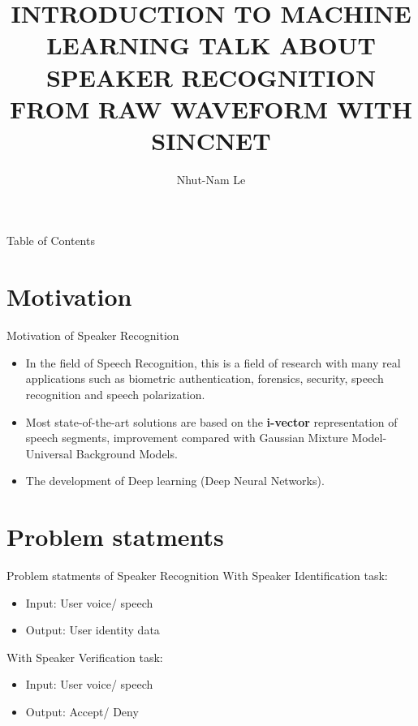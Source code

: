 \documentclass[notheorems, aspectratio=54]{beamer}
\author{Nhut-Nam Le}
\title{INTRODUCTION TO MACHINE LEARNING \newline TALK ABOUT SPEAKER RECOGNITION FROM \newline RAW WAVEFORM WITH SINCNET}
\institute{Department of Computer Science, University of Science, VNU}
\date[\today]{}
\begin{document}
\begin{frame}
	\titlepage
\end{frame}

\begin{frame}{Table of Contents}
	\tableofcontents
\end{frame}

\section{Motivation}
\begin{frame}{Motivation of Speaker Recognition}
	\begin{itemize}
		\item In the field of Speech Recognition, this is a field of research with many real applications such as biometric authentication, forensics, security, speech recognition and speech polarization.
		\item Most state-of-the-art solutions are based on the \textbf{i-vector} representation of speech segments, improvement compared with Gaussian Mixture Model-Universal Background Models.
		\item The development of Deep learning (Deep Neural Networks).
	\end{itemize}
\end{frame}
\section{Problem statments}
\begin{frame}{Problem statments of Speaker Recognition}
	With Speaker Identification task:
	\begin{itemize}
		\item Input: User voice/ speech
		\item Output: User identity data
	\end{itemize}
	With Speaker Verification task:
	\begin{itemize}
		\item Input: User voice/ speech
		\item Output: Accept/ Deny
	\end{itemize}
\end{frame}
\end{document}
